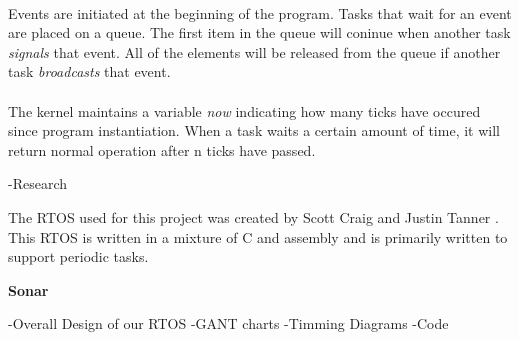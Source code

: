 \\
Events are initiated at the beginning of the program. Tasks that wait for an event are placed on a queue. The first item in the queue will coninue when another task \textit{signals} that event. All of the elements will be released from the queue if another task \textit{broadcasts} that event. \\

\\
The kernel maintains a variable \textit{now} indicating how many ticks have occured since program instantiation. When a task waits a certain amount of time, it will return normal operation after n ticks have passed.


-Research




The RTOS used for this project was created by Scott Craig and Justin Tanner \cite{RTOSSJ}. This RTOS is written in a mixture of C and assembly and is primarily written to support periodic tasks.   




\noindent\textbf{Sonar}

-Overall Design of our RTOS
-GANT charts
-Timming Diagrams
-Code
